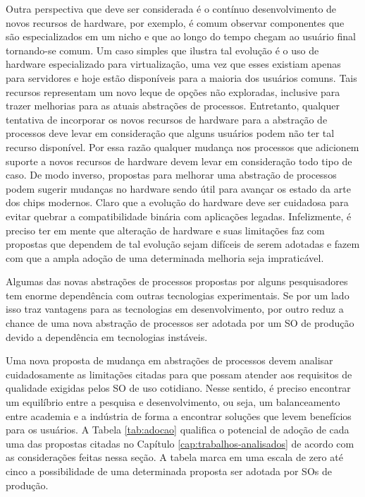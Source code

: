 Outra perspectiva que deve ser considerada é o contínuo desenvolvimento de novos
recursos de hardware, por exemplo, é comum observar componentes que
são especializados em um nicho e que ao longo do tempo chegam ao usuário
final tornando-se comum. Um caso simples que ilustra tal evolução é o
uso de hardware especializado para virtualização, uma vez que esses existiam
apenas para servidores e hoje estão disponíveis para a maioria dos usuários
comuns. Tais recursos representam um novo leque de opções não exploradas,
inclusive para trazer melhorias para as atuais abstrações de processos.
Entretanto, qualquer tentativa de incorporar os novos recursos de hardware para
a abstração de processos deve levar em consideração que alguns usuários podem
não ter tal recurso disponível. Por essa razão qualquer mudança nos processos
que adicionem suporte a novos recursos de hardware devem levar em consideração
todo tipo de caso. De modo inverso, propostas para melhorar uma abstração de
processos podem sugerir mudanças no hardware sendo útil para avançar os
estado da arte dos chips modernos. Claro que a evolução do hardware deve ser
cuidadosa para evitar quebrar a compatibilidade binária com aplicações legadas.
Infelizmente, é preciso ter em mente que alteração de hardware e suas
limitações faz com propostas que dependem de tal evolução sejam difíceis de
serem adotadas e fazem com que a ampla adoção de uma determinada melhoria seja
impraticável.

Algumas das novas abstrações de processos propostas por alguns pesquisadores
tem enorme dependência com outras tecnologias experimentais. Se por um lado
isso traz vantagens para as tecnologias em desenvolvimento, por outro reduz a
chance de uma nova abstração de processos ser adotada por um SO de produção
devido a dependência em tecnologias instáveis.

Uma nova proposta de mudança em abstrações de processos devem analisar
cuidadosamente as limitações citadas para que possam atender aos requisitos de
qualidade exigidas pelos SO de uso cotidiano. Nesse sentido, é preciso encontrar
um equilíbrio entre a pesquisa e desenvolvimento, ou seja, um balanceamento
entre academia e a indústria de forma a encontrar soluções que levem benefícios
para os usuários. A Tabela \ref{tab:adocao} qualifica o potencial de adoção de
cada uma das propostas citadas no Capítulo \ref{cap:trabalhos-analisados} de
acordo com as considerações feitas nessa seção. A tabela marca em uma escala de
zero até cinco a possibilidade de uma determinada proposta ser adotada por SOs
de produção.


